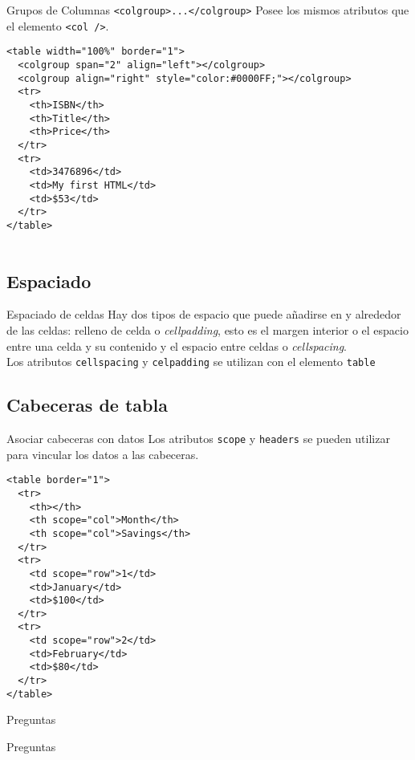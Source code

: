 \documentclass{beamer}
\begin{document}
\begin{frame}[fragile]{Grupos de Columnas \texttt{<colgroup>...</colgroup>}} %
    Posee los mismos atributos que el elemento \texttt{<col />}. 
    \begin{lstlisting}
<table width="100%" border="1">
  <colgroup span="2" align="left"></colgroup>
  <colgroup align="right" style="color:#0000FF;"></colgroup>
  <tr>
    <th>ISBN</th>
    <th>Title</th>
    <th>Price</th>
  </tr>
  <tr>
    <td>3476896</td>
    <td>My first HTML</td>
    <td>$53</td>
  </tr>
</table>
        
    \end{lstlisting}
\end{frame}

\subsection{Espaciado} %
\label{sub:Espaciado}

\begin{frame}{Espaciado de celdas} %
    Hay dos tipos de espacio que puede añadirse en y alrededor de las celdas:
    relleno de celda o \textit{cellpadding}, esto es el margen interior o el
    espacio entre una celda y su contenido y el espacio entre celdas o
    \textit{cellspacing}. \\[0.5cm]

    Los atributos \texttt{cellspacing} y \texttt{celpadding} se utilizan con el
    elemento \texttt{table}

\end{frame}


\subsection{Cabeceras de tabla} %
\label{sub:Cabeceras de tabla}

\begin{frame}[fragile]{Asociar cabeceras con datos} %
    {\tiny
    Los atributos \texttt{scope} y \texttt{headers} se pueden utilizar para
    vincular los datos a las cabeceras. 
        }
\begin{lstlisting}
<table border="1">
  <tr>
    <th></th>
    <th scope="col">Month</th>
    <th scope="col">Savings</th>
  </tr>
  <tr>
    <td scope="row">1</td>
    <td>January</td>
    <td>$100</td>
  </tr>
  <tr>
    <td scope="row">2</td>
    <td>February</td>
    <td>$80</td>
  </tr>
</table>    
\end{lstlisting}
\end{frame}


\begin{frame}{Preguntas} %
    \begin{center}
    Preguntas
    \end{center}
\end{frame}


\end{document}
